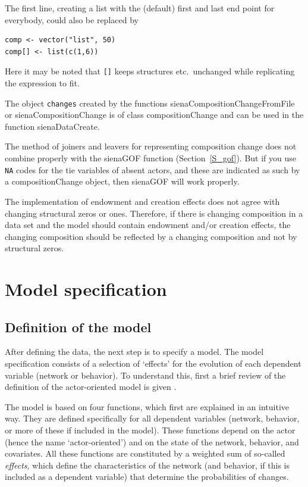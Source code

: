 \documentclass[a4paper,fleqn,11pt]{article}
\newcommand{\+}{\, + \,}
\newcommand{\sfn}[1]{\textsf{#1}}
\begin{document}
The first line, creating a list with the (default) first and
last end point for everybody, could also be replaced by
\begin{verbatim}
comp <- vector("list", 50)
comp[] <- list(c(1,6))
\end{verbatim}
Here it may be noted that \texttt{[]} keeps structures etc.\ unchanged
while replicating the expression to fit.

The object \texttt{changes} created by the functions
\sfn{sienaCompositionChangeFromFile} or
\sfn{sienaCompositionChange} is of class
\sfn{compositionChange} and can be used in the function
\sfn{sienaDataCreate}.

The method of joiners and leavers for representing composition change
does not combine properly with the \sfn{sienaGOF} function
(Section~\ref{S_gof}).
But if you use \texttt{NA} codes for the tie variables of absent actors,
and these are indicated as such by a \sfn{compositionChange} object, then
\sfn{sienaGOF}  will work properly.

The implementation of endowment and creation effects does not agree
with changing structural zeros or ones. Therefore, if there is
changing composition in a data set and the model should contain endowment
and/or creation effects, the changing composition should be reflected by
a changing composition and not by structural zeros.


\newpage
\section{Model specification}
\label{S_modspec}

\subsection{Definition of the model}
\label{S_defmod}

After defining the data, the next step is to specify a model.
The model specification consists of a selection of `effects'
for the evolution of each dependent variable (network or behavior).
To understand this, first a brief review of the definition of the
actor-oriented model is given
\citep*[for further explanations see][]{Snijders01, Snijders05,
SnijdersEA07, SnijdersEA10b}.

The model is based on four functions, which first are explained in an
intuitive way.
They are defined specifically for all dependent variables (network, behavior,
or more of these if included in the model).
These functions depend on the actor (hence the name `actor-oriented')
and on the state of the network, behavior, and covariates.
All these functions are constituted by a weighted sum
of so-called \emph{effects}, which define the characteristics of
the network (and behavior, if this is included as a dependent variable)
that determine the probabilities of changes.
\end{document}
